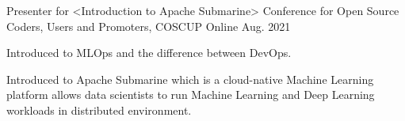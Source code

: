 

\begin{cventries}

  \cventry
    {Presenter for <Introduction to Apache Submarine>} %
    {Conference for Open Source Coders, Users and Promoters, COSCUP} %
    {Online} %
    {Aug. 2021} %
    {
      \begin{cvitems} %
        \item {Introduced to MLOps and the difference between DevOps.}
        \item {Introduced to Apache Submarine which is a cloud-native Machine Learning platform allows data scientists to run Machine Learning and Deep Learning workloads in distributed environment.}
      \end{cvitems}
    }
\end{cventries}
